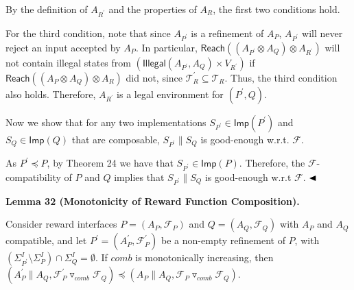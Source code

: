 \documentclass[10pt,a4paper]{article}
\begin{document}
 
  
By the definition of $A_{R^{\prime}}$ and the properties of $A_{R}$, the first two conditions hold.\par
 
 
 
For the third condition, note that since $A_{P^{\prime}}$ is a refinement of $A_{P}$, $A_{P^{\prime}}$ will never reject an input accepted by $A_{P}$. In particular, $\mathsf{Reach}((A_{P^{\prime}}\otimes A_{Q})\otimes A_{R^{\prime}})$ will not contain illegal states from $(\mathsf{Illegal}(A_{P^{\prime}},A_{Q})\times V_{R^{\prime}})$ if $\mathsf{Reach}((A_{P}\otimes A_{Q})\otimes A_{R})$ did not, since $\mathcal{T}^{\prime}_{R}\subseteq\mathcal{T}_{R}$. Thus, the third condition also holds. Therefore, $A_{R^{\prime}}$ is a legal environment for $(P^{\prime},Q)$.\par
 
 
 
Now we show that for any two implementations $S_{P^{\prime}}\in\mathsf{Imp}(P^{\prime})$ and $S_{Q}\in\mathsf{Imp}(Q)$ that are composable, $S_{P^{\prime}}\parallel S_{Q}$ is good-enough w.r.t. $\mathcal{F}$.\par
 
 
 
As $P^{\prime}\preceq P$, by Theorem 24 we have that $S_{P^{\prime}}\in\mathsf{Imp}(P)$. Therefore, the $\mathcal{F}$-compatibility of $P$ and $Q$ implies that $S_{P^{\prime}}\parallel S_{Q}$ is good-enough w.r.t $\mathcal{F}$. $\hfill\blacktriangleleft$\par
 
 
 
\par\medskip\noindent\textbf{Lemma 32 (Monotonicity of Reward Function Composition).}\par
 
 
Consider reward interfaces $P=(A_{P},\mathcal{F}_{P})$ and $Q=(A_{Q},\mathcal{F}_{Q})$ with $A_{P}$ and $A_{Q}$ compatible, and let $P^{\prime}=(A_{P}^{\prime},\mathcal{F}_{P}^{\prime})$ be a non-empty refinement of $P$, with $(\Sigma_{P^{\prime}}^{I}\setminus\Sigma_{P}^{I})\cap\Sigma_{Q}^{I}=\emptyset$. If $\mathit{comb}$ is monotonically increasing, then $(A_{P}^{\prime}\parallel A_{Q},{{\mathcal{F}_{P}^{\prime}}\mathbin{\triangledown_{\mathit{comb}}}{\mathcal{F}_{Q}}})\preceq(A_{P}\parallel A_{Q},{{\mathcal{F}_{P}}\mathbin{\triangledown_{\mathit{comb}}}{\mathcal{F}_{Q}}})$.\par
 
\end{document}
